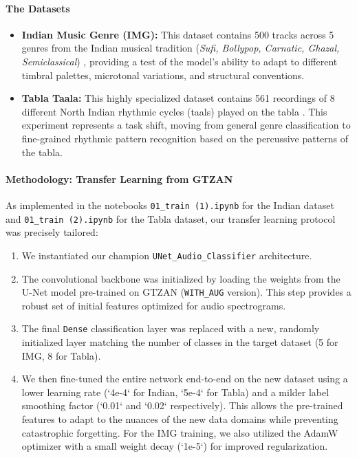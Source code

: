 \documentclass[11pt,a4paper]{article}
\begin{document}
\paragraph{The Datasets}
\begin{itemize}
    \item \textbf{Indian Music Genre (IMG):} This dataset contains 500 tracks across 5 genres from the Indian musical tradition (\textit{Sufi, Bollypop, Carnatic, Ghazal, Semiclassical}) \textbf{\cite{kaggleIndianMusic}}, %
    providing a test of the model's ability to adapt to different timbral palettes, microtonal variations, and structural conventions.
    \item \textbf{Tabla Taala:} This highly specialized dataset contains 561 recordings of 8 different North Indian rhythmic cycles (taals) played on the tabla \textbf{\cite{kaggleTablaTaala}}. %
    This experiment represents a task shift, moving from general genre classification to fine-grained rhythmic pattern recognition based on the percussive patterns of the tabla.
\end{itemize}

\paragraph{Methodology: Transfer Learning from GTZAN}
As implemented in the notebooks \texttt{01\_train (1).ipynb} for the Indian dataset and \texttt{01\_train (2).ipynb} for the Tabla dataset, our transfer learning protocol was precisely tailored:
\begin{enumerate}
    \item We instantiated our champion \texttt{UNet\_Audio\_Classifier} architecture.
    \item The convolutional backbone was initialized by loading the weights from the U-Net model pre-trained on GTZAN (\texttt{WITH\_AUG} version). This step provides a robust set of initial features optimized for audio spectrograms.
    \item The final \texttt{Dense} classification layer was replaced with a new, randomly initialized layer matching the number of classes in the target dataset (5 for IMG, 8 for Tabla).
    \item We then fine-tuned the entire network end-to-end on the new dataset using a lower learning rate (`4e-4` for Indian, `5e-4` for Tabla) and a milder label smoothing factor (`0.01` and `0.02` respectively). This allows the pre-trained features to adapt to the nuances of the new data domains while preventing catastrophic forgetting. For the IMG training, we also utilized the AdamW optimizer with a small weight decay (`1e-5`) for improved regularization.
\end{enumerate}
\end{document}
